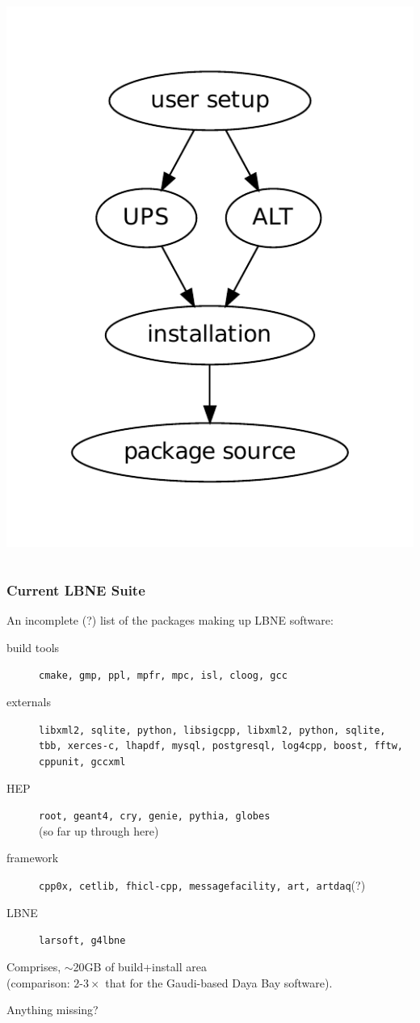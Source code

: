 \documentclass[xcolor=dvipsnames]{beamer}
\begin{document}
\begin{frame}
\begin{columns}
\begin{column}{0.4\paperwidth}
      \includegraphics[width=\textwidth]{worch-deps}
    \end{column}
  \end{columns}
\end{frame}

\begin{frame}
  \frametitle{Current LBNE Suite}
  An incomplete (?) list of the packages making up LBNE software:
  \begin{description}
  \item[build tools] \texttt{cmake, gmp, ppl, mpfr, mpc, isl, cloog, gcc}
  \item[externals] \texttt{libxml2, sqlite, python, libsigcpp, libxml2, python, sqlite, tbb, xerces-c, lhapdf, mysql, postgresql, log4cpp, boost, fftw, cppunit, gccxml}
  \item[HEP] \texttt{root, geant4, cry, genie, pythia, globes} \\
    {\tiny (so far up through here)}
  \item[framework] \texttt{cpp0x, cetlib, fhicl-cpp, messagefacility, art, artdaq}(?)
  \item[LBNE] \texttt{larsoft, g4lbne}
  \end{description}
  Comprises, $\sim$20GB of build+install area \\
  (comparison: $2\mbox{-}3\times$ that for the Gaudi-based Daya Bay software).

  \vspace{5mm}
  
  Anything missing?
\end{frame}
\end{document}
